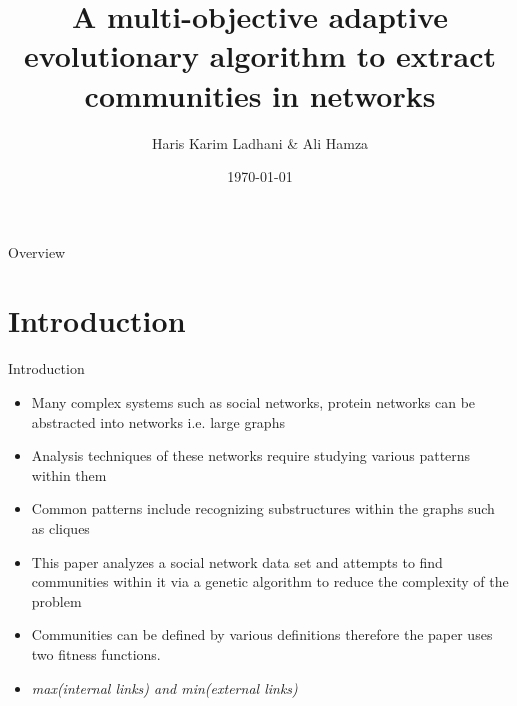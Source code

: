 \documentclass[aspectratio=169,xcolor=dvipsnames]{beamer}
\title[short title]{A multi-objective adaptive evolutionary algorithm to extract communities in networks} %
\author[Haris-Ali] {Haris Karim Ladhani \& Ali Hamza}
\institute[HU-CI] %
{
    CS 451 - Computational Intelligence \\
    Habib University %
}
\date{\today} %
\begin{document}
\begin{frame}
    \titlepage
\end{frame}

\begin{frame}{Overview}
    \tableofcontents
\end{frame}

\section{Introduction}

\begin{frame}{Introduction}
\begin{itemize}
    \item Many complex systems such as social networks, protein networks can be abstracted into networks i.e. large graphs
    \item Analysis techniques of these networks require studying various patterns within them
    \item Common patterns include recognizing substructures within the graphs such as cliques
    \item This paper analyzes a social network data set and attempts to find communities within it via a genetic algorithm to reduce the complexity of the problem
    \item Communities can be defined by various definitions therefore the paper uses two fitness functions.
    \item \textit{max(internal links) and min(external links)}
\end{itemize}

\end{frame}
\end{document}
